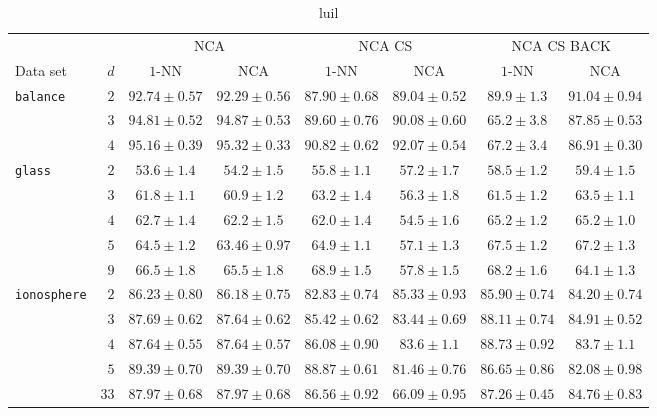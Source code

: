 \begin{landscape}
  \begin{table}
    \centering\begin{tabular}{lrcccccc}
      \toprule
      &     & \multicolumn{2}{c}{NCA}  & \multicolumn{2}{c}{NCA CS} & \multicolumn{2}{c}{NCA CS BACK}\\
      \cmidrule(r){3-4} \cmidrule(r){5-6} \cmidrule(r){7-8}
      Data set & $d$ & $1$-NN & NCA & $1$-NN & NCA & $1$-NN & NCA \\
      \midrule
      \texttt{balance}&$2$&$92.74 \pm 0.57$&$92.29 \pm 0.56$&$87.90 \pm 0.68$&$89.04 \pm 0.52$&$89.9 \pm 1.3$&$91.04 \pm 0.94$\\ 
      &$3$&$94.81 \pm 0.52$&$94.87 \pm 0.53$&$89.60 \pm 0.76$&$90.08 \pm 0.60$&$65.2 \pm 3.8$&$87.85 \pm 0.53$\\ 
      &$4$&$95.16 \pm 0.39$&$95.32 \pm 0.33$&$90.82 \pm 0.62$&$92.07 \pm 0.54$&$67.2 \pm 3.4$&$86.91 \pm 0.30$\\ 
      \midrule
      \texttt{glass}&$2$&$53.6 \pm 1.4$&$54.2 \pm 1.5$&$55.8 \pm 1.1$&$57.2 \pm 1.7$&$58.5 \pm 1.2$&$59.4 \pm 1.5$\\ 
      &$3$&$61.8 \pm 1.1$&$60.9 \pm 1.2$&$63.2 \pm 1.4$&$56.3 \pm 1.8$&$61.5 \pm 1.2$&$63.5 \pm 1.1$\\ 
      &$4$&$62.7 \pm 1.4$&$62.2 \pm 1.5$&$62.0 \pm 1.4$&$54.5 \pm 1.6$&$65.2 \pm 1.2$&$65.2 \pm 1.0$\\ 
      &$5$&$64.5 \pm 1.2$&$63.46 \pm 0.97$&$64.9 \pm 1.1$&$57.1 \pm 1.3$&$67.5 \pm 1.2$&$67.2 \pm 1.3$\\ 
      &$9$&$66.5 \pm 1.8$&$65.5 \pm 1.8$&$68.9 \pm 1.5$&$57.8 \pm 1.5$&$68.2 \pm 1.6$&$64.1 \pm 1.3$\\ 
      \midrule
      \texttt{ionosphere}&$2$&$86.23 \pm 0.80$&$86.18 \pm 0.75$&$82.83 \pm 0.74$&$85.33 \pm 0.93$&$85.90 \pm 0.74$&$84.20 \pm 0.74$\\ 
      &$3$&$87.69 \pm 0.62$&$87.64 \pm 0.62$&$85.42 \pm 0.62$&$83.44 \pm 0.69$&$88.11 \pm 0.74$&$84.91 \pm 0.52$\\ 
      &$4$&$87.64 \pm 0.55$&$87.64 \pm 0.57$&$86.08 \pm 0.90$&$83.6 \pm 1.1$&$88.73 \pm 0.92$&$83.7 \pm 1.1$\\ 
      &$5$&$89.39 \pm 0.70$&$89.39 \pm 0.70$&$88.87 \pm 0.61$&$81.46 \pm 0.76$&$86.65 \pm 0.86$&$82.08 \pm 0.98$\\ 
      &$33$&$87.97 \pm 0.68$&$87.97 \pm 0.68$&$86.56 \pm 0.92$&$66.09 \pm 0.95$&$87.26 \pm 0.45$&$84.76 \pm 0.83$\\ 
      \bottomrule
    \end{tabular}
  \caption{luil}
  \end{table}


\end{landscape}
